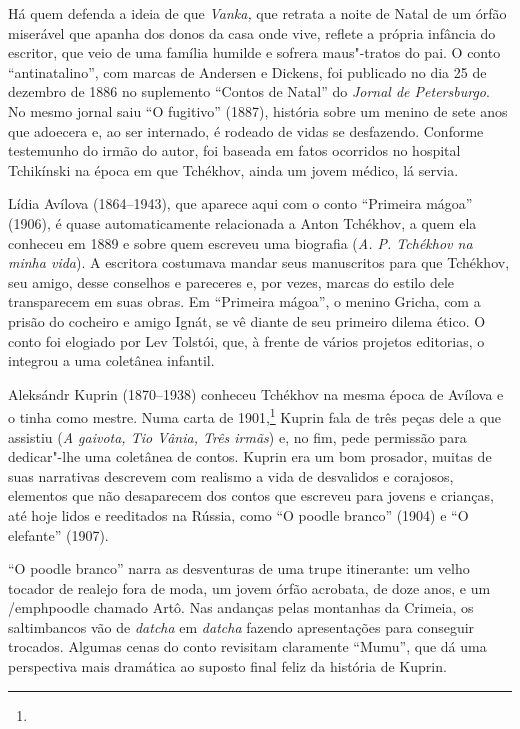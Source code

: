 Há quem defenda a ideia de que \emph{Vanka,} que retrata a noite de Natal
de um órfão miserável que apanha dos donos da casa onde vive, reflete a
própria infância do escritor, que veio de uma família humilde e sofrera
maus"-tratos do pai. O conto ``antinatalino'', com marcas de Andersen e
Dickens, foi publicado no dia 25 de dezembro de 1886 no suplemento
``Contos de Natal'' do \emph{Jornal de Petersburgo}. No mesmo jornal
saiu ``O fugitivo'' (1887), história sobre um menino de sete
anos que adoecera e, ao ser internado, é rodeado de vidas se desfazendo.
Conforme testemunho do irmão do autor, foi baseada em fatos ocorridos no
hospital Tchikínski na época em que Tchékhov, ainda um jovem médico, lá
servia.

Lídia Avílova (1864--1943), que aparece aqui com o conto ``Primeira
mágoa'' (1906), é quase automaticamente relacionada a Anton Tchékhov, a
quem ela conheceu em 1889 e sobre quem escreveu uma biografia (\emph{A.
P. Tchékhov na minha vida}). A escritora costumava mandar seus
manuscritos para que Tchékhov, seu amigo, desse conselhos e pareceres e,
por vezes, marcas do estilo dele transparecem em suas obras. Em
``Primeira mágoa'', o menino Gricha, com a prisão do
cocheiro e amigo Ignát, se vê diante de seu primeiro dilema ético. O conto foi
elogiado por Lev Tolstói, que, à frente de vários projetos editorias, o
integrou a uma coletânea infantil.

Aleksándr Kuprin (1870--1938) conheceu Tchékhov na mesma época de
Avílova e o tinha como mestre. Numa carta de 1901,\footnote{} Kuprin fala de três peças
dele a que assistiu (\emph{A gaivota, Tio Vânia, Três irmãs}) e, no fim,
pede permissão para dedicar"-lhe uma coletânea de contos. Kuprin era um
bom prosador, muitas de suas narrativas descrevem com realismo a vida de
desvalidos e corajosos, elementos que não desaparecem dos contos que
escreveu para jovens e crianças, até hoje lidos e reeditados na Rússia,
como ``O poodle branco'' (1904) e ``O elefante'' (1907).

``O poodle branco'' narra as desventuras de uma trupe itinerante:
um velho tocador de realejo fora de moda, um jovem órfão acrobata, de
doze anos, e um /emph{poodle} chamado Artô. Nas andanças pelas montanhas da
Crimeia, os saltimbancos vão de \emph{datcha} em \emph{datcha} fazendo
apresentações para conseguir trocados. Algumas cenas do conto revisitam
claramente ``Mumu'', que dá uma perspectiva mais dramática ao
suposto final feliz da história de Kuprin.

